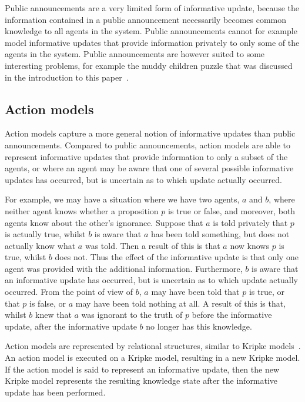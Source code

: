 Public announcements are a very limited form of informative update, because the
information contained in a public announcement necessarily becomes common
knowledge to all agents in the system. Public announcements cannot for example
model informative updates that provide information privately to only some of
the agents in the system. Public announcements are however suited to some
interesting problems, for example the muddy children puzzle that was discussed
in the introduction to this paper~\cite{vanditmarsch2007dynamic}.

\subsection{Action models}

Action models capture a more general notion of informative updates than public
announcements. Compared to public announcements, action models are able to
represent informative updates that provide information to only a subset of the
agents, or where an agent may be aware that one of several possible informative
updates has occurred, but is uncertain as to which update actually occurred. 

For example, we may have a situation where we have two agents, $a$ and $b$,
where neither agent knows whether a proposition $p$ is true or false, and
moreover, both agents know about the other's ignorance. Suppose that $a$ is told
privately that $p$ is actually true, whilst $b$ is aware that $a$ has been told
something, but does not actually know what $a$ was told. Then a result of this
is that $a$ now knows $p$ is true, whilst $b$ does not. Thus the effect of the
informative update is that only one agent was provided with the additional
information. Furthermore, $b$ is aware that an informative update has occurred,
but is uncertain as to which update actually occurred. From the point of view of
$b$, $a$ may have been told that $p$ is true, or that $p$ is false, or $a$ may
have been told nothing at all. A result of this is that, whilst $b$ knew that
$a$ was ignorant to the truth of $p$ before the informative update, after the
informative update $b$ no longer has this knowledge.

Action models are represented by relational structures, similar to Kripke
models~\cite{vanditmarsch2007dynamic}. An action model is executed on a Kripke
model, resulting in a new Kripke model. If the action model is said to represent
an informative update, then the new Kripke model represents the resulting
knowledge state after the informative update has been performed.

